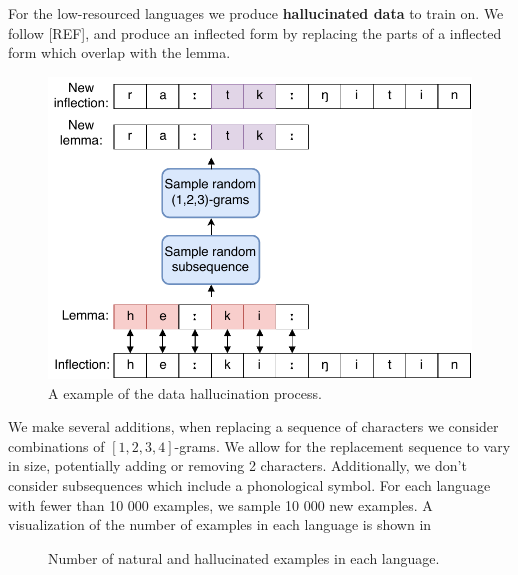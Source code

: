 \documentclass[11pt,a4paper]{article}
\begin{document}
For the low-resourced languages we produce \textbf{hallucinated data}
to train on. We follow [REF], and produce an inflected form by
replacing the parts of a inflected form which overlap with the lemma.

\begin{figure}
\centering
\includegraphics[scale=0.5]{hall.pdf}
\caption{A example of the data hallucination process.}
\end{figure}

We make several additions, when replacing a sequence of characters we
consider combinations of $[1,2,3,4]$-grams. We allow for the
replacement sequence to vary in size, potentially adding or removing 2
characters. Additionally, we don't consider subsequences which include
a phonological symbol.  For each language with fewer than 10 000
examples, we sample 10 000 new examples. A visualization of the number
of examples in each language is shown in

\begin{figure}[ht]
\caption{\label{fig:data} Number of natural and hallucinated examples in each language.}
\end{figure}
\end{document}

